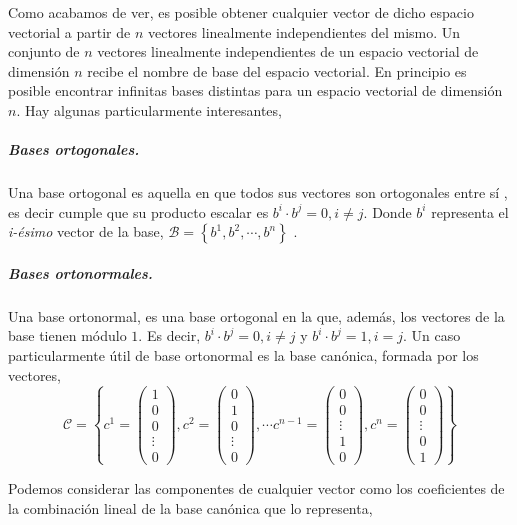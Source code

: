  Como acabamos de ver, es posible obtener cualquier vector de dicho espacio vectorial a partir de $n$ vectores linealmente independientes del mismo. Un conjunto de $n$ vectores linealmente independientes de un espacio vectorial de dimensión $n$ recibe el nombre de base del espacio vectorial. En principio es posible encontrar infinitas bases distintas para un espacio vectorial de dimensión $n$. Hay algunas particularmente interesantes,
 
 \subparagraph{Bases ortogonales.} Una base ortogonal es aquella en que todos sus vectores son ortogonales entre sí , es decir cumple que su producto escalar es $b^i\cdot b^j=0, i\neq j$. Donde  $b^i$ representa el \emph{i-ésimo} vector de la base, $\mathcal{B}=\left\lbrace b^1, b^2, \cdots, b^n  \right\rbrace $ .
 
 \subparagraph{Bases ortonormales.} Una base ortonormal, es una base ortogonal en la que, además, los vectores de la base tienen módulo $1$. Es decir, $b^i\cdot b^j=0, i\neq j$ y  $b^i\cdot b^j=1, i = j$. Un caso particularmente útil de base ortonormal es la base canónica, formada por los vectores, 
\begin{equation*}
\mathcal{C}=\left\lbrace c^1=\begin{pmatrix}
1\\
0\\
0\\
\vdots \\
0
\end{pmatrix}, c^2=\begin{pmatrix}
0\\
1\\
0\\
\vdots \\
0
\end{pmatrix},
\cdots
c^{n-1}=\begin{pmatrix}
0\\
0\\
\vdots \\
1\\
0
\end{pmatrix},
c^n=\begin{pmatrix}
0\\
0\\
\vdots \\
0\\
1
\end{pmatrix} \right\rbrace
\end{equation*} 

Podemos considerar las componentes de cualquier vector como los coeficientes de la combinación lineal de la base canónica que lo representa,

